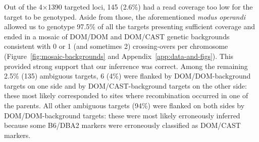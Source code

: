 \begin{mccorrection}



Out of the 4$\times$1390 targeted loci, 145 (2.6\%) had a read coverage too low for the target to be genotyped.
Aside from those, the aforementioned \textit{modus operandi} allowed us to genotype 97.5\% of all the targets presenting sufficient coverage and ended in a mosaic of DOM/DOM and DOM/CAST genetic backgrounds consistent with 0 or 1 (and sometimes 2) crossing-overs per chromosome (Figure~\ref{fig:mosaic-backgrounds} and Appendix~\ref{app:data-and-figs}). 
This provided strong support that our inferrence was correct.
Among the remaining 2.5\% (135) ambiguous targets, 6 (4\%) were flanked by DOM/DOM-background targets on one side and by DOM/CAST-background targets on the other side: these most likely corresponded to sites where recombination occurred in one of the parents.
All other ambiguous targets (94\%) were flanked on both sides by DOM/DOM-background targets: these were most likely erroneously inferred because some B6/DBA2 markers were erroneously classified as DOM/CAST markers.



\end{mccorrection}
